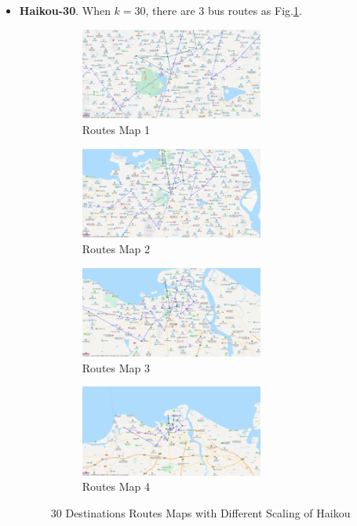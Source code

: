 \documentclass{llncs}
\begin{document}
\begin{itemize}
	\item \textbf{Haikou-30}. When $k=30$, there are $3$ bus routes as Fig.\ref{fig-hk-30}.
	
		\begin{figure}[htbp]
		\centering
		\begin{subfigure}[t]{0.45\textwidth}
			\begin{minipage}{6cm}
				\centering
				\includegraphics[width=6cm]{figures/hk_30_1.png}
				\caption{Routes Map 1}
			\end{minipage}%
		\end{subfigure}
		\begin{subfigure}[t]{0.45\textwidth}
			\begin{minipage}{6cm}
				\centering
				\includegraphics[width=6cm]{figures/hk_30_2.png}
				\caption{Routes Map 2}
			\end{minipage}
		\end{subfigure}
		\begin{subfigure}[t]{0.45\textwidth}
			\begin{minipage}{6cm}
				\centering
				\includegraphics[width=6cm]{figures/hk_30_3.png}
				\caption{Routes Map 3}
			\end{minipage}%
		\end{subfigure}
		\begin{subfigure}[t]{0.45\textwidth}
			\begin{minipage}{6cm}
				\centering
				\includegraphics[width=6cm]{figures/hk_30_4.png}
				\caption{Routes Map 4}
			\end{minipage}
		\end{subfigure}
		\caption{$30$ Destinations Routes Maps with Different Scaling of Haikou}
		\label{fig-hk-30}
	\end{figure}
	

\end{itemize}
\end{document}
